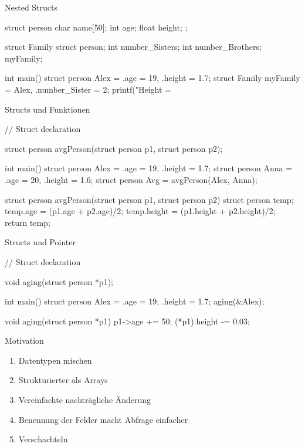 \documentclass[10pt]{beamer}
\begin{document}
	\begin{frame}[fragile]{Nested Structs}
		\begin{myr}
			struct person{
				char name[50];
				int age;
				float height;
			}; 
			
			struct Family{
				struct person;
				int number_Sisters;
				int number_Brothers;
			} myFamily;
			
			int main(){
				struct person Alex = {.age = 19, .height = 1.7};
				struct Family myFamily = {Alex, .number_Sister = 2};
				printf("Height = %
			}\end{myr}
	\end{frame}
	
	\begin{frame}[fragile]{Structs und Funktionen}
		\begin{myr}
		// Struct declaration
		
		struct person avgPerson(struct person p1, struct person p2);
		
		int main(){
			struct person Alex = {.age = 19, .height = 1.7};
			struct person Anna = {.age = 20, .height = 1.6};
			struct person Avg = avgPerson(Alex, Anna);
		}
	
		struct person avgPerson(struct person p1, struct person p2){
			struct person temp;
			temp.age = (p1.age + p2.age)/2;
			temp.height = (p1.height + p2.height)/2;
			return temp;
		}\end{myr}
	\end{frame}

	\begin{frame}[fragile]{Structs und Pointer}
		\begin{myr}
		// Struct declaration
		
		void aging(struct person *p1);
		
		int main(){
			struct person Alex = {.age = 19, .height = 1.7};
			aging(&Alex);
		}
		
		void aging(struct person *p1){
			p1->age += 50;
			(*p1).height -= 0.03;
		}\end{myr}
	\end{frame}

	\begin{frame}{Motivation}
		\begin{enumerate}
			\item Datentypen mischen
			\item Strukturierter als Arrays
			\item Vereinfachte nachträgliche Änderung
			\item Benennung der Felder macht Abfrage einfacher
			\item Verschachteln 
		\end{enumerate}
	\end{frame}
	
\end{document}
